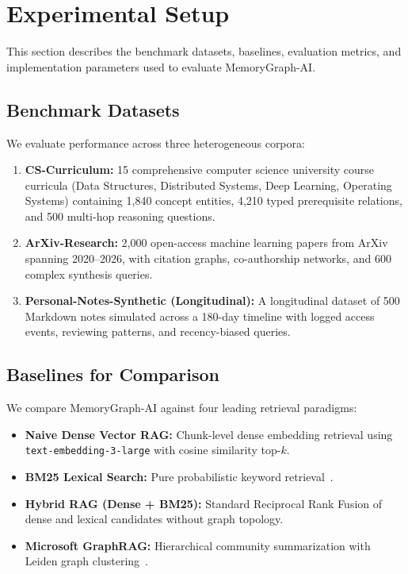 \section{Experimental Setup}
\label{sec:experiments}

This section describes the benchmark datasets, baselines, evaluation metrics, and implementation parameters used to evaluate MemoryGraph-AI.

\subsection{Benchmark Datasets}
We evaluate performance across three heterogeneous corpora:
\begin{enumerate}
    \item \textbf{CS-Curriculum:} 15 comprehensive computer science university course curricula (Data Structures, Distributed Systems, Deep Learning, Operating Systems) containing 1,840 concept entities, 4,210 typed prerequisite relations, and 500 multi-hop reasoning questions.
    \item \textbf{ArXiv-Research:} 2,000 open-access machine learning papers from ArXiv spanning 2020--2026, with citation graphs, co-authorship networks, and 600 complex synthesis queries.
    \item \textbf{Personal-Notes-Synthetic (Longitudinal):} A longitudinal dataset of 500 Markdown notes simulated across a 180-day timeline with logged access events, reviewing patterns, and recency-biased queries.
\end{enumerate}

\subsection{Baselines for Comparison}
We compare MemoryGraph-AI against four leading retrieval paradigms:
\begin{itemize}
    \item \textbf{Naive Dense Vector RAG:} Chunk-level dense embedding retrieval using \texttt{text-embedding-3-large} with cosine similarity top-$k$.
    \item \textbf{BM25 Lexical Search:} Pure probabilistic keyword retrieval~\cite{robertson2009bm25}.
    \item \textbf{Hybrid RAG (Dense + BM25):} Standard Reciprocal Rank Fusion of dense and lexical candidates without graph topology.
    \item \textbf{Microsoft GraphRAG:} Hierarchical community summarization with Leiden graph clustering~\cite{edge2024graphrag}.
\end{itemize}

